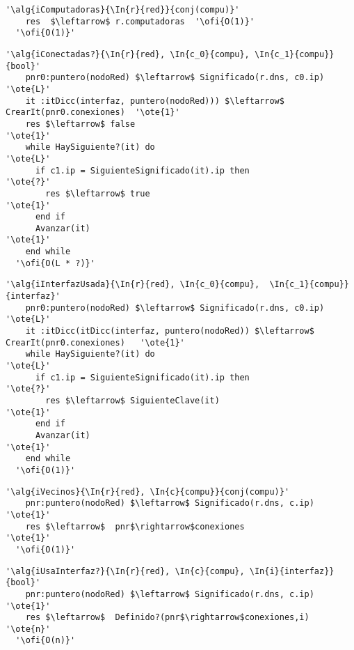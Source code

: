 \begin{lstlisting}[mathescape]
  '\alg{iComputadoras}{\In{r}{red}}{conj(compu)}'
    res  $\leftarrow$ r.computadoras  '\ofi{O(1)}'
  '\ofi{O(1)}'
\end{lstlisting}

\begin{lstlisting}[mathescape]
  '\alg{iConectadas?}{\In{r}{red}, \In{c_0}{compu}, \In{c_1}{compu}}{bool}'
    pnr0:puntero(nodoRed) $\leftarrow$ Significado(r.dns, c0.ip)                   '\ote{L}' 
    it :itDicc(interfaz, puntero(nodoRed))) $\leftarrow$ CrearIt(pnr0.conexiones)  '\ote{1}' 
    res $\leftarrow$ false                                                         '\ote{1}'
    while HaySiguiente?(it) do                                                     '\ote{L}'
      if c1.ip = SiguienteSignificado(it).ip then                                  '\ote{?}'
        res $\leftarrow$ true                                                      '\ote{1}'
      end if
      Avanzar(it)                                                                  '\ote{1}'
    end while
  '\ofi{O(L * ?)}'
\end{lstlisting}

\begin{lstlisting}[mathescape]
  '\alg{iInterfazUsada}{\In{r}{red}, \In{c_0}{compu},  \In{c_1}{compu}}{interfaz}'
    pnr0:puntero(nodoRed) $\leftarrow$ Significado(r.dns, c0.ip)                          '\ote{L}' 
    it :itDicc(itDicc(interfaz, puntero(nodoRed)) $\leftarrow$ CrearIt(pnr0.conexiones)   '\ote{1}' 
    while HaySiguiente?(it) do                                                            '\ote{L}'
      if c1.ip = SiguienteSignificado(it).ip then                                         '\ote{?}'
        res $\leftarrow$ SiguienteClave(it)                                               '\ote{1}'
      end if
      Avanzar(it)                                                                         '\ote{1}'
    end while
  '\ofi{O(1)}'
\end{lstlisting}


\begin{lstlisting}[mathescape]
  '\alg{iVecinos}{\In{r}{red}, \In{c}{compu}}{conj(compu)}'
    pnr:puntero(nodoRed) $\leftarrow$ Significado(r.dns, c.ip)                            '\ote{1}'
    res $\leftarrow$  pnr$\rightarrow$conexiones                                          '\ote{1}'
  '\ofi{O(1)}'
\end{lstlisting}

\begin{lstlisting}[mathescape]
  '\alg{iUsaInterfaz?}{\In{r}{red}, \In{c}{compu}, \In{i}{interfaz}}{bool}'
    pnr:puntero(nodoRed) $\leftarrow$ Significado(r.dns, c.ip)                            '\ote{1}'
    res $\leftarrow$  Definido?(pnr$\rightarrow$conexiones,i)                             '\ote{n}'
  '\ofi{O(n)}'
\end{lstlisting}

